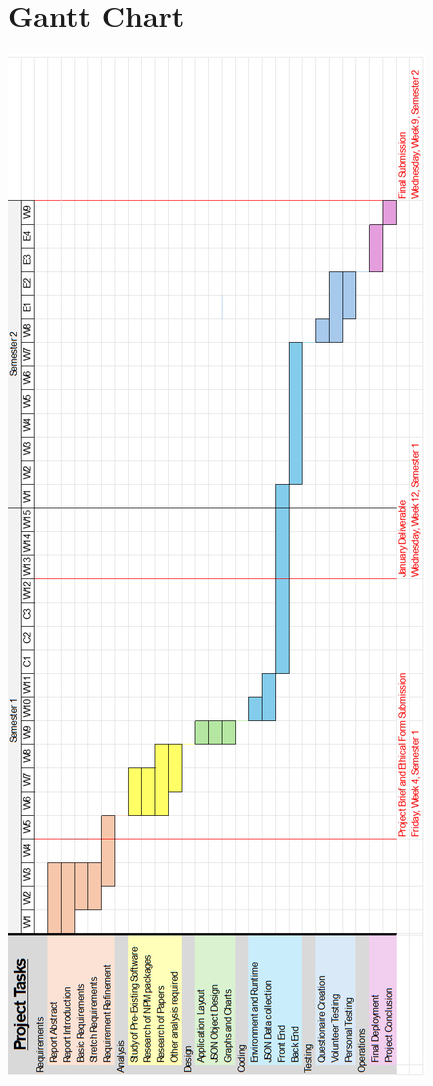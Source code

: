 \documentclass{report}
\begin{document}
\section{Gantt Chart}
    \begin{center}
        \includegraphics[height=0.95\textheight]{gantt_chart}
    \end{center}
\end{document}
